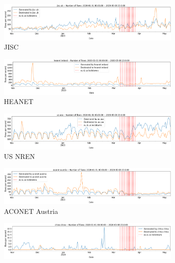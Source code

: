 \documentclass[10pt, journal, letterpaper]{IEEEtran}
\begin{document}
\begin{figure}
    \begin{subfigure}{\textwidth}
          \centering
          \includegraphics[width=\columnwidth]{img/jisc_fps.png}
          \caption{JISC}
          \label{fig:jisc_fps}
    \end{subfigure}
    \begin{subfigure}{\textwidth}
          \centering
          \includegraphics[width=\columnwidth]{img/heanet_fps.png}
          \caption{HEANET}
          \label{fig:HEANET_fps}
    \end{subfigure}
    \begin{subfigure}{\textwidth}
          \centering
          \includegraphics[width=\columnwidth]{img/us_fps.png}
          \caption{US NREN}
          \label{fig:US_fps}
    \end{subfigure}
    \begin{subfigure}{\textwidth}
          \centering
          \includegraphics[width=\columnwidth]{img/aconet.fps.png}
          \caption{ACONET Austria}
          \label{fig:aconet_fps}
    \end{subfigure}
    \begin{subfigure}{\textwidth}
          \centering
          \includegraphics[width=\columnwidth]{img/china_fps.png}

\end{subfigure}
\end{figure}
\end{document}

